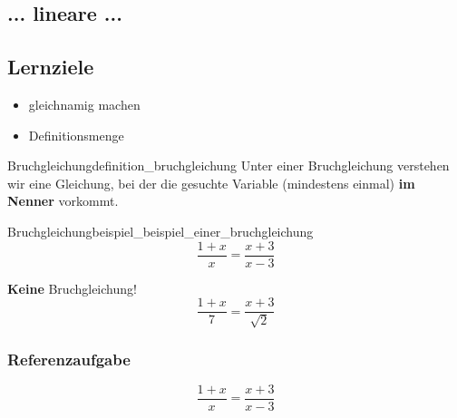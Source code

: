 
\subsection{... lineare ...}






\subsection*{Lernziele}

\begin{itemize}
	\item gleichnamig machen
  \item Definitionsmenge
\end{itemize}

\begin{definition}{Bruchgleichung}{definition_bruchgleichung}
  Unter einer Bruchgleichung verstehen wir eine Gleichung, bei der die
  gesuchte Variable (mindestens einmal) \textbf{im Nenner} vorkommt.
\end{definition}

\begin{beispiel}{Bruchgleichung}{beispiel_beispiel_einer_bruchgleichung}
$$\frac{1+x}{x}=\frac{x+3}{x-3}$$
\end{beispiel}

\begin{bemerkung}{\textbf{Keine} Bruchgleichung!}{}
  $$\frac{1+x}7=\frac{x+3}{\sqrt{2}}$$
  \end{bemerkung}
\newpage
\subsubsection{Referenzaufgabe}

$$\frac{1+x}{x}=\frac{x+3}{x-3}$$
  
